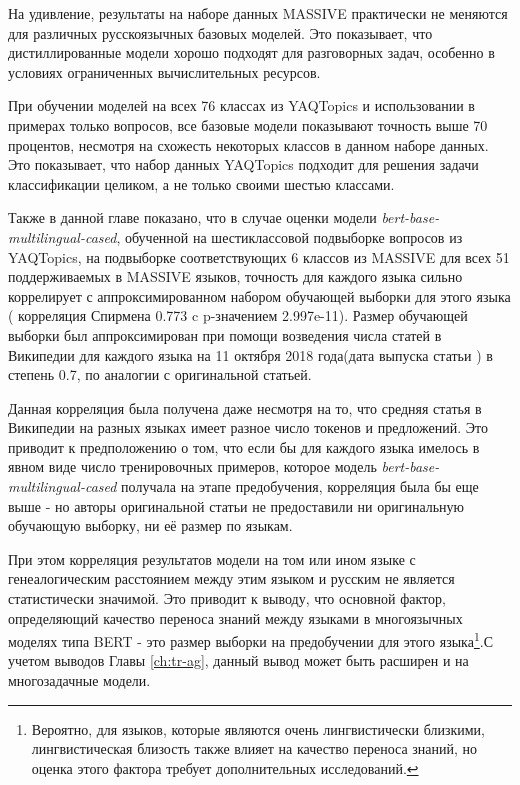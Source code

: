 На удивление, результаты на наборе данных {MASSIVE} практически не меняются для различных русскоязычных базовых моделей. Это показывает, что дистиллированные модели хорошо подходят для разговорных задач, особенно в условиях ограниченных вычислительных ресурсов.

При обучении моделей на всех 76 классах из {YAQTopics} и использовании в примерах только вопросов, все базовые модели показывают точность выше 70 процентов, несмотря на схожесть некоторых классов в данном наборе данных. Это показывает, что набор данных {YAQTopics} подходит для решения задачи классификации целиком, а не только своими шестью классами.

Также в данной главе показано, что в случае оценки модели  \textit{bert-base-multilingual-cased}, обученной на шестиклассовой подвыборке вопросов из {YAQTopics}, на подвыборке соответствующих 6 классов из {MASSIVE} для всех 51 поддерживаемых в {MASSIVE} языков, точность для каждого языка сильно коррелирует с аппроксимированном набором обучающей выборки для этого языка ( корреляция Спирмена 0.773 c p-значением 2.997e-11). Размер обучающей выборки был аппроксимирован при помощи возведения числа статей в Википедии для каждого языка на 11 октября 2018 года(дата выпуска статьи \cite{bert}) в степень 0.7, по аналогии с оригинальной статьей.

Данная корреляция была получена даже несмотря на то, что средняя статья в Википедии на разных языках имеет разное число токенов и предложений. Это приводит к предположению о том, что если бы для каждого языка имелось в явном виде число тренировочных примеров, которое модель \textit{bert-base-multilingual-cased} получала на этапе предобучения, корреляция была бы еще выше - но авторы оригинальной статьи не предоставили ни оригинальную обучающую выборку, ни её размер по языкам. 

При этом корреляция результатов модели на том или ином языке с генеалогическим расстоянием между этим языком и русским не является статистически значимой. Это приводит к выводу, что основной фактор, определяющий качество переноса знаний между языками в многоязычных моделях типа BERT - это размер выборки на предобучении для этого языка\footnote{Вероятно, для языков, которые являются очень лингвистически близкими, лингвистическая близость также влияет на качество переноса знаний, но оценка этого фактора требует дополнительных исследований.}.С учетом выводов Главы \ref{ch:tr-ag}, данный вывод может быть расширен и на многозадачные модели. 

